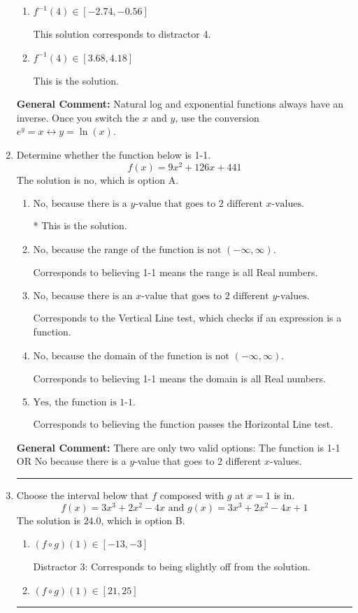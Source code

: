 \documentclass{extbook}[14pt]
\newcommand{\litem}[1]{\item #1

\rule{\textwidth}{0.4pt}}
\begin{document}
\begin{enumerate}
{\begin{enumerate}[label=\Alph*.]
 This solution corresponds to distractor 1.
\item \( f^{-1}(4) \in [-2.74, -0.56] \)

 This solution corresponds to distractor 4.
\item \( f^{-1}(4) \in [3.68, 4.18] \)

 This is the solution.
\end{enumerate}

\textbf{General Comment:} Natural log and exponential functions always have an inverse. Once you switch the $x$ and $y$, use the conversion $ e^y = x \leftrightarrow y=\ln(x)$.
}
\litem{
Determine whether the function below is 1-1.
\[ f(x) = 9 x^2 + 126 x + 441 \]The solution is \( \text{no} \), which is option A.\begin{enumerate}[label=\Alph*.]
\item \( \text{No, because there is a $y$-value that goes to 2 different $x$-values.} \)

* This is the solution.
\item \( \text{No, because the range of the function is not $(-\infty, \infty)$.} \)

Corresponds to believing 1-1 means the range is all Real numbers.
\item \( \text{No, because there is an $x$-value that goes to 2 different $y$-values.} \)

Corresponds to the Vertical Line test, which checks if an expression is a function.
\item \( \text{No, because the domain of the function is not $(-\infty, \infty)$.} \)

Corresponds to believing 1-1 means the domain is all Real numbers.
\item \( \text{Yes, the function is 1-1.} \)

Corresponds to believing the function passes the Horizontal Line test.
\end{enumerate}

\textbf{General Comment:} There are only two valid options: The function is 1-1 OR No because there is a $y$-value that goes to 2 different $x$-values.
}
\litem{
Choose the interval below that $f$ composed with $g$ at $x=1$ is in.
\[ f(x) = 3x^{3} +2 x^{2} -4 x \text{ and } g(x) = 3x^{3} +2 x^{2} -4 x + 1 \]The solution is \( 24.0 \), which is option B.\begin{enumerate}[label=\Alph*.]
\item \( (f \circ g)(1) \in [-13, -3] \)

 Distractor 3: Corresponds to being slightly off from the solution.
\item \( (f \circ g)(1) \in [21, 25] \)


\end{enumerate}}
\end{enumerate}
\end{document}
